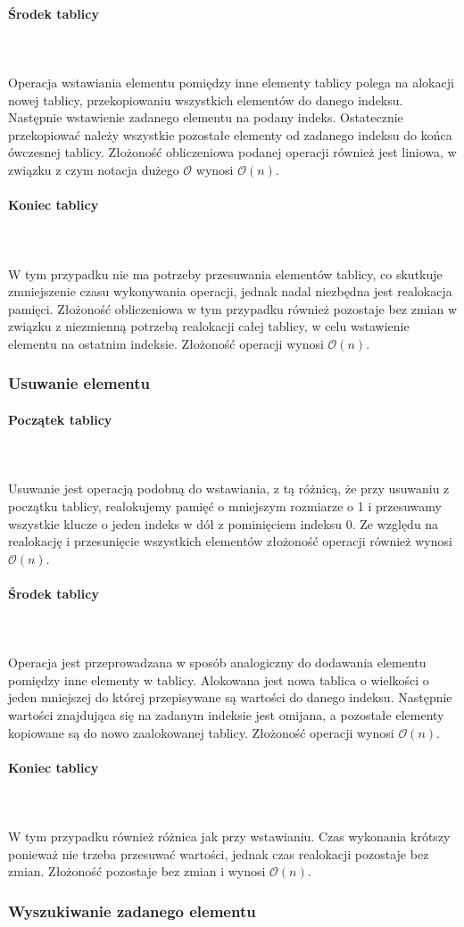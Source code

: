 \documentclass{article}
\newcommand{\myparagraph}[1]{\paragraph{#1}\mbox{}\\\\}
\begin{document}
\myparagraph{Środek tablicy} 
Operacja wstawiania elementu pomiędzy inne elementy tablicy polega na alokacji nowej tablicy, przekopiowaniu wszystkich elementów do danego indeksu. Następnie wstawienie zadanego elementu na podany indeks. Ostatecznie przekopiować należy wszystkie pozostałe elementy od zadanego indeksu do końca ówczesnej tablicy. Złożoność obliczeniowa podanej operacji również jest liniowa, w związku z czym notacja dużego $\mathcal{O}$ wynosi $\mathcal{O}(n)$.

\myparagraph{Koniec tablicy} 
W tym przypadku nie ma potrzeby przesuwania elementów tablicy, co skutkuje zmniejszenie czasu wykonywania operacji, jednak nadal niezbędna jest realokacja pamięci. 
Złożoność obliczeniowa w tym przypadku również pozostaje bez zmian w związku z niezmienną potrzebą realokacji całej tablicy, w celu wstawienie \linebreak elementu na ostatnim indeksie. Złożoność operacji wynosi $\mathcal{O}(n)$.
 
\subsubsection{Usuwanie elementu}

\myparagraph{Początek tablicy}
Usuwanie jest operacją podobną do wstawiania, z tą różnicą, że przy usuwaniu z początku tablicy, realokujemy pamięć o mniejszym rozmiarze o 1 i przesuwamy wszystkie klucze o jeden indeks w dół z pominięciem indeksu 0. 
Ze względu na realokację i przesunięcie wszystkich elementów złożoność operacji również wynosi $\mathcal{O}(n)$.
 
\myparagraph{Środek tablicy} 
Operacja jest przeprowadzana w sposób analogiczny do dodawania elementu pomiędzy inne elementy w tablicy.
Alokowana jest nowa tablica o wielkości o jeden mniejszej do której przepisywane są wartości do danego indeksu. Następnie wartości znajdująca się na zadanym indeksie jest omijana, a pozostałe elementy kopiowane są do nowo zaalokowanej tablicy. Złożoność operacji wynosi $\mathcal{O}(n)$.


\myparagraph{Koniec tablicy} 
W tym przypadku również różnica jak przy wstawianiu. Czas wykonania krótszy ponieważ nie trzeba przesuwać wartości, jednak czas realokacji pozostaje bez zmian. Złożoność pozostaje bez zmian i wynosi $\mathcal{O}(n)$.
 
\subsubsection{Wyszukiwanie zadanego elementu} 
\end{document}
